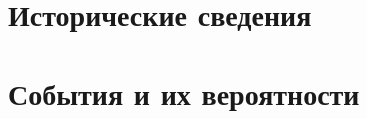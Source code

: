 
\usepackage{setspace}
\usepackage{amsmath, amssymb}
\newcommand{\noo}{\varnothing}
\usepackage{amsthm}
\DeclareMathOperator{\sinc}{sinc}

\newtheorem{mydef}{Определение}[section]

\newtheorem{theorem}{Теорема}[section]

\newtheorem{lemma}[theorem]{Лемма}%

\theoremstyle{definition}
\newtheorem{consq}[theorem]{Следствие}%
\newtheorem{definition}[theorem]{Определение}%
\newtheorem{deflemma}[theorem]{Лемма-определение}%
\newtheorem{zam}[theorem]{Замечание}

\theoremstyle{remark}
\newtheorem{remark}[theorem]{Замечание}%

\pagestyle{fancy} 
\fancyhead{} 
\fancyfoot{} 
\fancyfoot[C]{\thepage} 

\newcommand{\ssm}{\smallsetminus}
\renewcommand{\O}{\noo}
\renewcommand{\backslash}{\smallsetminus}





\def\labauthors{}
\def\labgroup{}
\def\labnumber{}
\def\labtheme{}
\renewcommand{\vec}{\mathbf}
\renewcommand{\Re}{\operatorname{Re}}
\renewcommand{\Im}{\operatorname{Im}}
\renewcommand{\phi}{\varphi}
\renewcommand{\kappa}{\varkappa}
\renewcommand{\hat}{\widehat}
\begin{spacing}{1}
\tableofcontents
\end{spacing}
\newpage
\part*{Исторические сведения}


\part{События и их вероятности}
